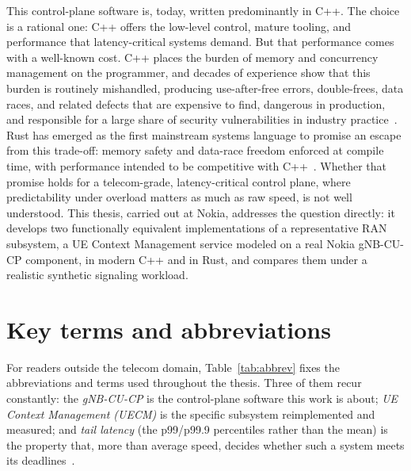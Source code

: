\documentclass[english,twoside,openright,a4paper,censored,csm,software-track-2020]{HYthesisML}
\begin{document}
This control-plane software is, today, written predominantly in C++. The choice is a
rational one: C++ offers the low-level control, mature tooling, and performance that
latency-critical systems demand. But that performance comes with a well-known cost. C++
places the burden of memory and concurrency management on the programmer, and decades of
experience show that this burden is routinely mishandled, producing use-after-free errors,
double-frees, data races, and related defects that are expensive to find, dangerous in
production, and responsible for a large share of security vulnerabilities in industry
practice~\cite{msrc2019memory,google2022android}. Rust has emerged as the first mainstream
systems language to promise an escape from this trade-off: memory safety and data-race
freedom enforced at compile time, with performance intended to be competitive with
C++~\cite{klabnik2023rust,jung2018rustbelt}. Whether that promise holds for a
telecom-grade, latency-critical control plane, where predictability under overload matters
as much as raw speed, is not well understood. This thesis, carried out at Nokia, addresses
the question directly: it develops two functionally equivalent implementations of a
representative RAN subsystem, a UE Context Management service modeled on a real Nokia
gNB-CU-CP component, in modern C++ and in Rust, and compares them under a realistic
synthetic signaling workload.

\section{Key terms and abbreviations}
For readers outside the telecom domain, Table~\ref{tab:abbrev} fixes the abbreviations and terms
used throughout the thesis. Three of them recur constantly: the \emph{gNB-CU-CP} is the
control-plane software this work is about; \emph{UE Context Management (UECM)} is the specific
subsystem reimplemented and measured; and \emph{tail latency} (the p99/p99.9 percentiles rather
than the mean) is the property that, more than average speed, decides whether such a system
meets its deadlines~\cite{dean2013tail,barroso2017microseconds}.
\end{document}
